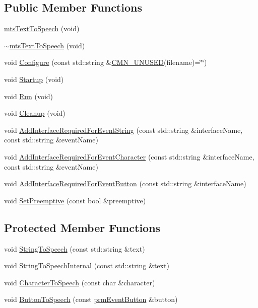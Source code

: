 \subsection*{Public Member Functions}
\begin{DoxyCompactItemize}
\item 
\hyperlink{classmts_text_to_speech_a9522af18806f0a7db41b744a3fca01be}{mts\-Text\-To\-Speech} (void)
\item 
\hyperlink{classmts_text_to_speech_a8640f37ee556b1de2ec39e5b99acbeb7}{$\sim$mts\-Text\-To\-Speech} (void)
\item 
void \hyperlink{classmts_text_to_speech_a7ac4d804f9e043bf877ea37138867687}{Configure} (const std\-::string \&\hyperlink{cmn_portability_8h_a021894e2626935fa2305434b1e893ff6}{C\-M\-N\-\_\-\-U\-N\-U\-S\-E\-D}(filename)=\char`\"{}\char`\"{})
\item 
void \hyperlink{classmts_text_to_speech_a68ada4f3cb8b578dcd535ae485fd576c}{Startup} (void)
\item 
void \hyperlink{classmts_text_to_speech_a9c724a185cfff331ccb781e16e4ed5b5}{Run} (void)
\item 
void \hyperlink{classmts_text_to_speech_ad8cedd061a3c8de77984d1e4f92acbcb}{Cleanup} (void)
\item 
void \hyperlink{classmts_text_to_speech_ab7d9d96da97ae6efe79be8be8c016514}{Add\-Interface\-Required\-For\-Event\-String} (const std\-::string \&interface\-Name, const std\-::string \&event\-Name)
\item 
void \hyperlink{classmts_text_to_speech_a1b9cc162cb293515534462dbeae0e164}{Add\-Interface\-Required\-For\-Event\-Character} (const std\-::string \&interface\-Name, const std\-::string \&event\-Name)
\item 
void \hyperlink{classmts_text_to_speech_a94cc67298b5ac7c6c9f739deb2c34f0a}{Add\-Interface\-Required\-For\-Event\-Button} (const std\-::string \&interface\-Name)
\item 
void \hyperlink{classmts_text_to_speech_af64ec5a504b4172cff06208f8c1e5553}{Set\-Preemptive} (const bool \&preemptive)
\end{DoxyCompactItemize}
\subsection*{Protected Member Functions}
\begin{DoxyCompactItemize}
\item 
void \hyperlink{classmts_text_to_speech_a853ce06b633030fd9f8d1aba3fbd6a8a}{String\-To\-Speech} (const std\-::string \&text)
\item 
void \hyperlink{classmts_text_to_speech_afb7bc9e687ccf8057e0ecf8b16e1c829}{String\-To\-Speech\-Internal} (const std\-::string \&text)
\item 
void \hyperlink{classmts_text_to_speech_a75f1f94a974a3c7cfe84c74b9a07c857}{Character\-To\-Speech} (const char \&character)
\item 
void \hyperlink{classmts_text_to_speech_aa9376ca24fd38dce907df77a61c15753}{Button\-To\-Speech} (const \hyperlink{classprm_event_button}{prm\-Event\-Button} \&button)
\end{DoxyCompactItemize}
